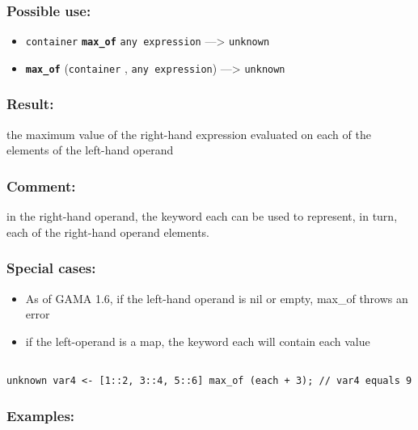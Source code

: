 \documentclass[]{book}
\providecommand{\tightlist}{%
  \setlength{\itemsep}{0pt}\setlength{\parskip}{0pt}}
\theoremstyle{definition}
\theoremstyle{definition}
\theoremstyle{definition}
\theoremstyle{remark}
\begin{document}
\subsubsection{Possible use:}\label{possible-use-341}

\begin{itemize}
\tightlist
\item
  \texttt{container} \textbf{\texttt{max\_of}} \texttt{any\ expression}
  ---\textgreater{} \texttt{unknown}
\item
  \textbf{\texttt{max\_of}} (\texttt{container} ,
  \texttt{any\ expression}) ---\textgreater{} \texttt{unknown}
\end{itemize}

\subsubsection{Result:}\label{result-330}

the maximum value of the right-hand expression evaluated on each of the
elements of the left-hand operand

\subsubsection{Comment:}\label{comment-66}

in the right-hand operand, the keyword each can be used to represent, in
turn, each of the right-hand operand elements.

\subsubsection{Special cases:}\label{special-cases-94}

\begin{itemize}
\tightlist
\item
  As of GAMA 1.6, if the left-hand operand is nil or empty, max\_of
  throws an error\\
\item
  if the left-operand is a map, the keyword each will contain each value
\end{itemize}

\begin{verbatim}
 
unknown var4 <- [1::2, 3::4, 5::6] max_of (each + 3); // var4 equals 9
\end{verbatim}

\subsubsection{Examples:}\label{examples-234}
\end{document}

